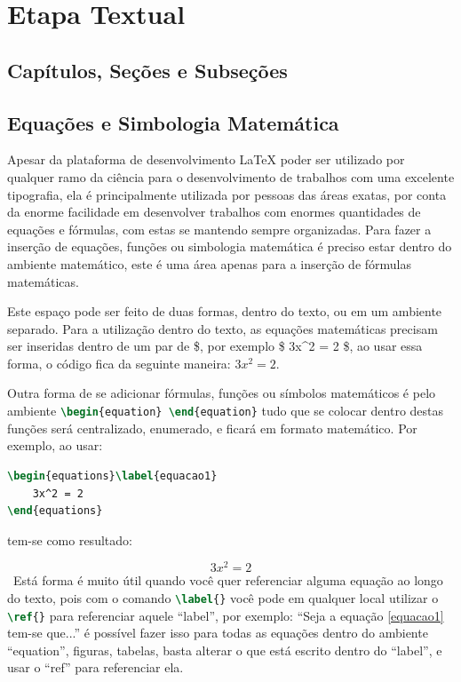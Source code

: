 \chapter{Etapa Textual}
\section{Capítulos, Seções e Subseções}


\section{Equações e Simbologia Matemática}
Apesar da plataforma de desenvolvimento LaTeX poder ser utilizado por qualquer ramo da ciência para o desenvolvimento de trabalhos com uma excelente tipografia, ela é principalmente utilizada por pessoas das áreas exatas, por conta da enorme facilidade em desenvolver trabalhos com enormes quantidades de equações e fórmulas, com estas se mantendo sempre organizadas. Para fazer a inserção de equações, funções ou simbologia matemática é preciso estar dentro do ambiente matemático, este é uma área apenas para a inserção de fórmulas matemáticas. 

Este espaço pode ser feito de duas formas, dentro do texto, ou em um ambiente separado. Para a utilização dentro do texto, as equações matemáticas precisam ser inseridas dentro de um par de \$, por exemplo \$ 3x\textasciicircum 2 = 2 \$, ao usar essa forma, o código fica da seguinte maneira: $3x^2=2$.

Outra forma de se adicionar fórmulas, funções ou símbolos matemáticos é pelo ambiente \lstinline[language=TeX]|\begin{equation} \end{equation}| tudo que se colocar dentro destas funções será centralizado, enumerado, e ficará em formato matemático. Por exemplo, ao usar:
\begin{lstlisting}[language=TeX]
\begin{equations}\label{equacao1}
	3x^2 = 2
\end{equations}
\end{lstlisting}
tem-se como resultado:

\begin{equation}\label{equacao1}
	3x^2 = 2
\end{equation}
\
Está forma é muito útil quando você quer referenciar alguma equação ao longo do texto, pois com o comando \lstinline[language=TeX]|\label{}| você pode em qualquer local utilizar o \lstinline[language=TeX]|\ref{}| para referenciar aquele ``label'', por exemplo: ``Seja a equação \ref{equacao1} tem-se que...'' é possível fazer isso para todas as equações dentro do ambiente ``equation'', figuras, tabelas, basta alterar o que está escrito dentro do ``label'', e usar o ``ref'' para referenciar ela.

